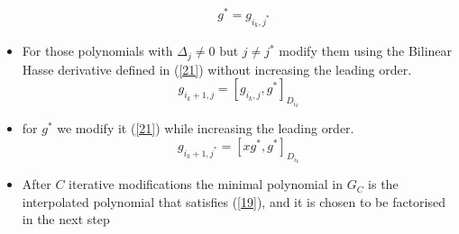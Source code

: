 \documentclass[fontsize=12pt]{article}
\begin{document}
\begin{itemize}
\begin{equation}
\begin{split}
&g^* =g_{i_k,j^*}
\end{split}
\end{equation}
\item For those polynomials with $\Delta_j \neq 0 \text{ but } j \neq j^*$ modify them using the Bilinear Hasse derivative defined in (\ref{21}) without increasing the leading order.
\begin{equation}
g_{i_k+1,j} = [g_{i_k,j}, g^*]_{D_{i_k}}
\end{equation}
\item for $g^*$ we modify it (\ref{21}) while increasing the leading order.
\begin{equation}
g_{i_k+1,j^*} = [xg^*, g^*]_{D_{i_k}}
\end{equation}
\item After $C$ iterative modifications the
minimal polynomial in $G_C$ is the interpolated polynomial that
satisfies (\ref{19}), and it is chosen to be factorised in the next step
\end{itemize}
\end{document}
